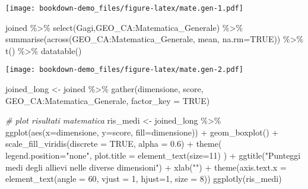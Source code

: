 \documentclass[
]{book}
\newenvironment{Shaded}{\begin{snugshade}}{\end{snugshade}}
\newcommand{\AttributeTok}[1]{\textcolor[rgb]{0.77,0.63,0.00}{#1}}
\newcommand{\CommentTok}[1]{\textcolor[rgb]{0.56,0.35,0.01}{\textit{#1}}}
\newcommand{\ConstantTok}[1]{\textcolor[rgb]{0.00,0.00,0.00}{#1}}
\newcommand{\DecValTok}[1]{\textcolor[rgb]{0.00,0.00,0.81}{#1}}
\newcommand{\FloatTok}[1]{\textcolor[rgb]{0.00,0.00,0.81}{#1}}
\newcommand{\FunctionTok}[1]{\textcolor[rgb]{0.00,0.00,0.00}{#1}}
\newcommand{\NormalTok}[1]{#1}
\newcommand{\OtherTok}[1]{\textcolor[rgb]{0.56,0.35,0.01}{#1}}
\newcommand{\SpecialCharTok}[1]{\textcolor[rgb]{0.00,0.00,0.00}{#1}}
\newcommand{\StringTok}[1]{\textcolor[rgb]{0.31,0.60,0.02}{#1}}
\begin{document}
\texttt{[image: bookdown-demo\_files/figure-latex/mate.gen-1.pdf]}

\begin{Shaded}
\begin{Highlighting}[]
\NormalTok{joined }\SpecialCharTok{\%\textgreater{}\%} \FunctionTok{select}\NormalTok{(Gagi,GEO\_CA}\SpecialCharTok{:}\NormalTok{Matematica\_Generale) }\SpecialCharTok{\%\textgreater{}\%}
  \FunctionTok{summarise}\NormalTok{(}\FunctionTok{across}\NormalTok{(GEO\_CA}\SpecialCharTok{:}\NormalTok{Matematica\_Generale, mean, }\AttributeTok{na.rm=}\ConstantTok{TRUE}\NormalTok{)) }\SpecialCharTok{\%\textgreater{}\%}
  \FunctionTok{t}\NormalTok{() }\SpecialCharTok{\%\textgreater{}\%}
  \FunctionTok{datatable}\NormalTok{()}
\end{Highlighting}
\end{Shaded}

\texttt{[image: bookdown-demo\_files/figure-latex/mate.gen-2.pdf]}

\begin{Shaded}
\begin{Highlighting}[]
\NormalTok{joined\_long }\OtherTok{\textless{}{-}}\NormalTok{ joined }\SpecialCharTok{\%\textgreater{}\%}
  \FunctionTok{gather}\NormalTok{(dimensione, score, GEO\_CA}\SpecialCharTok{:}\NormalTok{Matematica\_Generale, }\AttributeTok{factor\_key =} \ConstantTok{TRUE}\NormalTok{)}

\CommentTok{\# plot risultati matematica}
\NormalTok{ris\_medi }\OtherTok{\textless{}{-}}\NormalTok{ joined\_long }\SpecialCharTok{\%\textgreater{}\%}
  \FunctionTok{ggplot}\NormalTok{(}\FunctionTok{aes}\NormalTok{(}\AttributeTok{x=}\NormalTok{dimensione, }\AttributeTok{y=}\NormalTok{score, }\AttributeTok{fill=}\NormalTok{dimensione)) }\SpecialCharTok{+}
  \FunctionTok{geom\_boxplot}\NormalTok{() }\SpecialCharTok{+}
  \FunctionTok{scale\_fill\_viridis}\NormalTok{(}\AttributeTok{discrete =} \ConstantTok{TRUE}\NormalTok{, }\AttributeTok{alpha =} \FloatTok{0.6}\NormalTok{) }\SpecialCharTok{+}
  \FunctionTok{theme}\NormalTok{(}
    \AttributeTok{legend.position=}\StringTok{"none"}\NormalTok{,}
    \AttributeTok{plot.title =} \FunctionTok{element\_text}\NormalTok{(}\AttributeTok{size=}\DecValTok{11}\NormalTok{)}
\NormalTok{  ) }\SpecialCharTok{+}
  \FunctionTok{ggtitle}\NormalTok{(}\StringTok{"Punteggi medi degli allievi nelle diverse dimensioni"}\NormalTok{) }\SpecialCharTok{+}
  \FunctionTok{xlab}\NormalTok{(}\StringTok{""}\NormalTok{) }\SpecialCharTok{+}
  \FunctionTok{theme}\NormalTok{(}\AttributeTok{axis.text.x =} \FunctionTok{element\_text}\NormalTok{(}\AttributeTok{angle =} \DecValTok{60}\NormalTok{, }\AttributeTok{vjust =} \DecValTok{1}\NormalTok{, }\AttributeTok{hjust=}\DecValTok{1}\NormalTok{, }\AttributeTok{size =} \DecValTok{8}\NormalTok{))}
\FunctionTok{ggplotly}\NormalTok{(ris\_medi)}
\end{Highlighting}
\end{Shaded}
\end{document}
